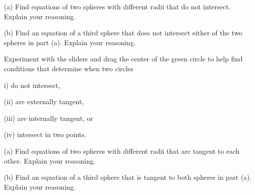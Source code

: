 \documentclass{ximera}
\begin{document}
\begin{question} \label{Q522:Coordinates}
(a) Find equations of two spheres with different radii that do not intersect. Explain your reasoning.

(b) Find an equation of a third sphere that does not intersect either of the two spheres in part (a). Explain your reasoning.


\begin{hint}
Experiment with the sliders and drag the center of the green circle to help find conditions that determine when two circles 

i) do not intersect,

(ii) are externally tangent,

(iii) are internally tangent, or

(iv) intersect in two points.

 
\begin{onlineOnly}
    \begin{center}
\end{center}
\end{onlineOnly}
\end{hint}




\end{question}





\begin{question} \label{Q52:Coordinates}
(a) Find equations of two spheres with different radii that are tangent to each other. Explain your reasoning.

(b) Find an equation of a third sphere that is tangent to both spheres in part (a). Explain your reasoning.
\end{question}
\end{document}
